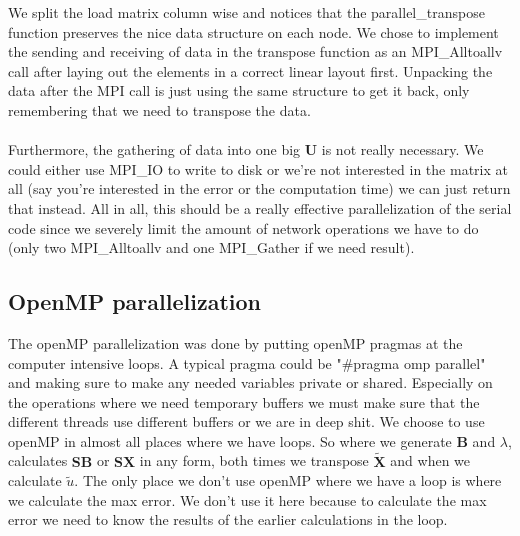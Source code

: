\noindent We split the load matrix column wise and notices that the parallel\_transpose function preserves the nice data structure on each node. We chose to implement the sending and receiving of data in the transpose function as an MPI\_Alltoallv call after laying out the elements in a correct linear layout first. Unpacking the data after the MPI call is just using the same structure to get it back, only remembering that we need to transpose the data.
\\ \\
Furthermore, the gathering of data into one big $\mathbf{U}$ is not really necessary. We could either use MPI\_IO to write to disk or we're not interested in the matrix at all (say you're interested in the error or the computation time) we can just return that instead. All in all, this should be a really effective parallelization of the serial code since we severely limit the amount of network operations we have to do (only two MPI\_Alltoallv and one MPI\_Gather if we need result).

\subsection*{OpenMP parallelization}
The openMP parallelization was done by putting openMP pragmas at the computer intensive loops. A typical pragma could be "\#pragma omp parallel" and making sure to make any needed variables private or shared. Especially on the operations where we need temporary buffers we must make sure that the different threads use different buffers or we are in deep shit. We choose to use openMP in almost all places where we have loops. So where we generate $\mathbf{B}$ and $\lambda$, calculates $\mathbf{SB}$ or $\mathbf{SX}$ in any form, both times we transpose $\mathbf{\widetilde{X}}$ and when we calculate $\widetilde{u}$. The only place we don't use openMP where we have a loop is where we calculate the max error. We don't use it here because  to calculate the max error we need to know the results of the earlier calculations in the loop.